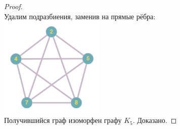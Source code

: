 \documentclass[a4paper,12pt]{article}
\numberwithin{figure}{section}
\theoremstyle{remark}
\begin{document}
\begin{proof}
	\\ Удалим подразбиения, заменив на прямые рёбра:
	\\ \includegraphics[width=5cm]{kuratovsky-task1-stage4.png}
	\\ Получившийся граф изоморфен графу $K_5$. Доказано.
\end{proof}
\end{document}
